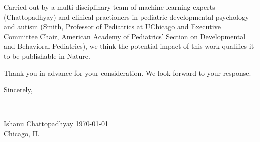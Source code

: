 \documentclass[10pt,onecolumn,compsoc]{IEEEtran}
\newcommand{\Space}{\vspace{10pt}}
\def\JNAME{Nature\xspace}
\begin{document}
Carried out by a multi-disciplinary team  of machine learning experts (Chattopadhyay) and clinical practioners in pediatric developmental psychology and autism (Smith, Professor of Pediatrics at UChicago and Executive Committee Chair, American Academy of Pediatrics' Section on Developmental and Behavioral
Pediatrics), we think the potential impact of this work qualifies it to be publishable in \JNAME. 

Thank you in advance for your consideration. We look forward to
your response.
\Space

Sincerely,
\vspace{0pt}

% 
\begin{flushleft}
\vspace{-15pt}

\rule{2.5in}{1pt}\\
{\fontsize{10}{10}\selectfont Ishanu Chattopadhyay}
\hfill \today\\
Chicago, IL
\end{flushleft}

\end{document}
